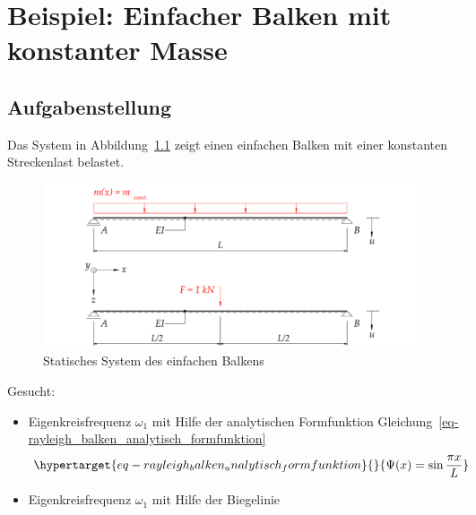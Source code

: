 \documentclass[
  letterpaper,
  DIV=11]{scrreprt}
\providecommand{\tightlist}{%
  \setlength{\itemsep}{0pt}\setlength{\parskip}{0pt}}\usepackage{longtable,booktabs,array}
\begin{document}
\hypertarget{beispiel-einfacher-balken-mit-konstanter-masse}{%
\chapter{Beispiel: Einfacher Balken mit konstanter
Masse}\label{beispiel-einfacher-balken-mit-konstanter-masse}}

\hypertarget{aufgabenstellung-2}{%
\section{Aufgabenstellung}\label{aufgabenstellung-2}}

Das System in Abbildung~\ref{fig-rayleigh_balken_system} zeigt einen
einfachen Balken mit einer konstanten Streckenlast belastet.

\begin{figure}[H]

{\centering \includegraphics{index_files/mediabag/bilder/aufgabe_rayleigh_balken.pdf}

}

\caption{\label{fig-rayleigh_balken_system}Statisches System des
einfachen Balkens}

\end{figure}

Gesucht:

\begin{itemize}
\tightlist
\item
  Eigenkreisfrequenz \(\omega_1\) mit Hilfe der analytischen
  Formfunktion
  Gleichung~\ref{eq-rayleigh_balken_analytisch_formfunktion}
  \begin{equation}\protect\hypertarget{eq-rayleigh_balken_analytisch_formfunktion}{}{
  \Psi(x) = \sin{\frac{\pi x}{L}}
  }\label{eq-rayleigh_balken_analytisch_formfunktion}\end{equation}
\item
  Eigenkreisfrequenz \(\omega_1\) mit Hilfe der Biegelinie
\end{itemize}
\end{document}
